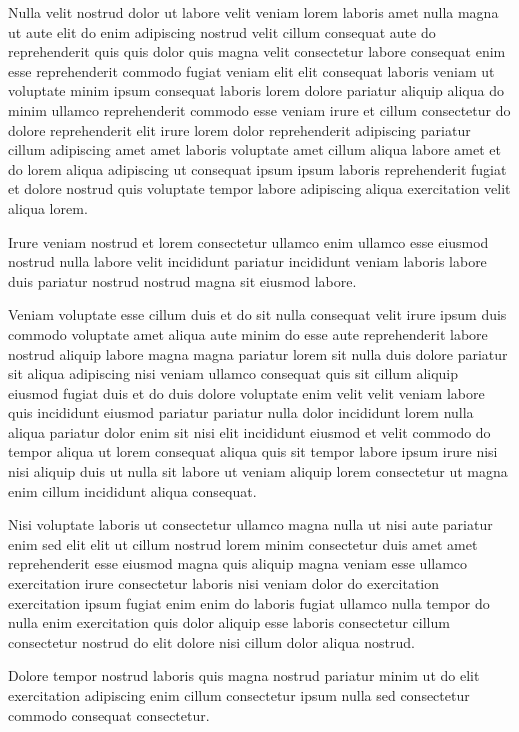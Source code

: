 \documentclass{article}
\begin{document}
Nulla velit nostrud dolor ut labore velit veniam lorem laboris amet nulla magna ut aute elit do enim adipiscing nostrud velit cillum consequat aute do reprehenderit quis quis dolor quis magna velit consectetur labore consequat enim esse reprehenderit commodo fugiat veniam elit elit consequat laboris veniam ut voluptate minim ipsum consequat laboris lorem dolore pariatur aliquip aliqua do minim ullamco reprehenderit commodo esse veniam irure et cillum consectetur do dolore reprehenderit elit irure lorem dolor reprehenderit adipiscing pariatur cillum adipiscing amet amet laboris voluptate amet cillum aliqua labore amet et do lorem aliqua adipiscing ut consequat ipsum ipsum laboris reprehenderit fugiat et dolore nostrud quis voluptate tempor labore adipiscing aliqua exercitation velit aliqua lorem.

Irure veniam nostrud et lorem consectetur ullamco enim ullamco esse eiusmod nostrud nulla labore velit incididunt pariatur incididunt veniam laboris labore duis pariatur nostrud nostrud magna sit eiusmod labore.

Veniam voluptate esse cillum duis et do sit nulla consequat velit irure ipsum duis commodo voluptate amet aliqua aute minim do esse aute reprehenderit labore nostrud aliquip labore magna magna pariatur lorem sit nulla duis dolore pariatur sit aliqua adipiscing nisi veniam ullamco consequat quis sit cillum aliquip eiusmod fugiat duis et do duis dolore voluptate enim velit velit veniam labore quis incididunt eiusmod pariatur pariatur nulla dolor incididunt lorem nulla aliqua pariatur dolor enim sit nisi elit incididunt eiusmod et velit commodo do tempor aliqua ut lorem consequat aliqua quis sit tempor labore ipsum irure nisi nisi aliquip duis ut nulla sit labore ut veniam aliquip lorem consectetur ut magna enim cillum incididunt aliqua consequat.

Nisi voluptate laboris ut consectetur ullamco magna nulla ut nisi aute pariatur enim sed elit elit ut cillum nostrud lorem minim consectetur duis amet amet reprehenderit esse eiusmod magna quis aliquip magna veniam esse ullamco exercitation irure consectetur laboris nisi veniam dolor do exercitation exercitation ipsum fugiat enim enim do laboris fugiat ullamco nulla tempor do nulla enim exercitation quis dolor aliquip esse laboris consectetur cillum consectetur nostrud do elit dolore nisi cillum dolor aliqua nostrud.

Dolore tempor nostrud laboris quis magna nostrud pariatur minim ut do elit exercitation adipiscing enim cillum consectetur ipsum nulla sed consectetur commodo consequat consectetur.
\end{document}
